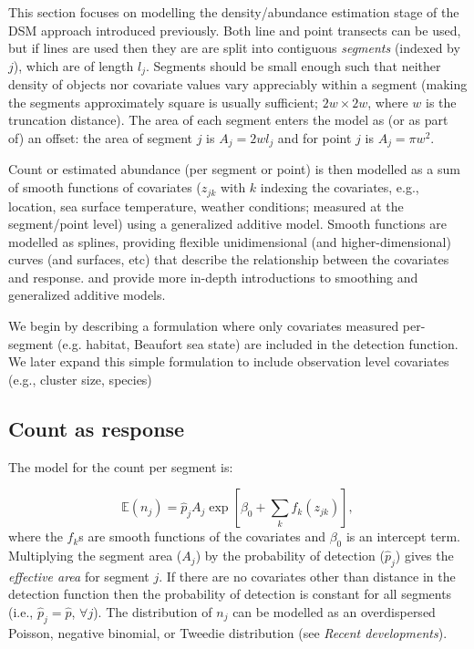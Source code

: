 \documentclass[a4paper,12pt]{article}
\begin{document}
This section focuses on modelling the density/abundance estimation stage of the DSM approach introduced previously. Both line and point transects can be used, but if lines are used then they are are split into contiguous \textit{segments} (indexed by $j$), which are of length $l_j$. Segments should be small enough such that neither density of objects nor covariate values vary appreciably within a segment (making the segments approximately square is usually sufficient; $2w\times 2w$, where $w$ is the truncation distance). The area of each segment enters the model as (or as part of) an offset: the area of segment $j$ is $A_j = 2wl_j$ and for point $j$ is $A_j=\pi w^2$. 

Count or estimated abundance (per  segment or point) is then modelled as a sum of smooth functions of covariates ($z_{jk}$ with $k$ indexing the covariates, e.g., location, sea surface temperature, weather conditions; measured at the segment/point level) using a generalized additive model. Smooth functions are modelled as splines, providing flexible unidimensional (and higher-dimensional) curves (and surfaces, etc) that describe the relationship between the covariates and response. \cite{Wood:2006wz} and \cite{ruppert2003semiparametric} provide more in-depth introductions to smoothing and generalized additive models.

We begin by describing a formulation where only covariates measured per-segment (e.g. habitat, Beaufort sea state) are included in the detection function. We later expand this simple formulation to include observation level covariates (e.g., cluster size, species)

\subsection*{Count as response}

The model for the count per segment is:

\begin{equation*}
\mathbb{E}(n_j) = \hat{p}_j A_j \exp\left[ \beta_0 + \sum_k f_k\left(z_{jk}\right) \right],
\end{equation*}
where the $f_k$s are smooth functions of the covariates and $\beta_0$ is an intercept term. Multiplying the segment area ($A_j$) by the probability of detection ($\hat{p}_j$) gives the \textit{effective area} for segment $j$. If there are no covariates other than distance in the detection function then the probability of detection is constant for all segments (i.e., $\hat{p}_j=\hat{p}$, $\forall j$). The distribution of $n_j$ can be modelled as an overdispersed Poisson, negative binomial, or Tweedie distribution (see \textit{Recent developments}).
\end{document}
